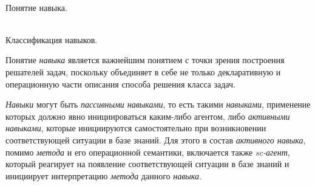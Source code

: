 \begin{frame}{\\Понятие навыка.}
	\topline
	\justifying
        \begin{SCn}
        \end{SCn}
\end{frame}

\begin{frame}{\\Классификация навыков.}
	\topline
	\justifying
    \vspace{0.33cm}
    
Понятие \textit{навыка} является важнейшим понятием с точки зрения построения решателей задач, поскольку объединяет в себе не только декларативную и операционную части описания способа решения класса задач.

\textit{Навыки} могут быть \textit{пассивными навыками}, то есть такими \textit{навыками}, применение которых должно явно инициироваться каким-либо агентом, либо \textit{активными навыками}, которые инициируются самостоятельно при возникновении соответствующей ситуации в базе знаний. Для этого в состав \textit{активного навыка}, помимо \textit{метода} и его операционной семантики, включается также \textit{sc-агент}, который реагирует на появление соответствующей ситуации в базе знаний и инициирует интерпретацию \textit{метода} данного \textit{навыка}.
\end{frame}

	
